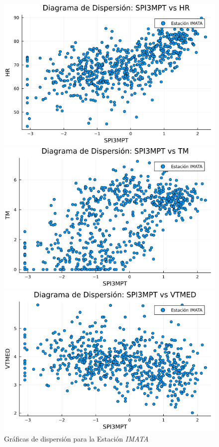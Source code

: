 \begin{figure}[htbp]
\centering
\caption{Gráficas de dispersión para la Estación \textit{IMATA}}
\begin{minipage}{0.32\textwidth}
    \centering
    \includegraphics[width=\linewidth]{Capitulos/Scaterplot/IMATA_SPI3MPT_vs_HR.png}
\end{minipage}\hfill
\begin{minipage}{0.32\textwidth}
    \centering
    \includegraphics[width=\linewidth]{Capitulos/Scaterplot/IMATA_SPI3MPT_vs_TM.png}
\end{minipage}\hfill
\begin{minipage}{0.32\textwidth}
    \centering
    \includegraphics[width=\linewidth]{Capitulos/Scaterplot/IMATA_SPI3MPT_vs_VTMED.png}

\end{minipage}
\end{figure}
